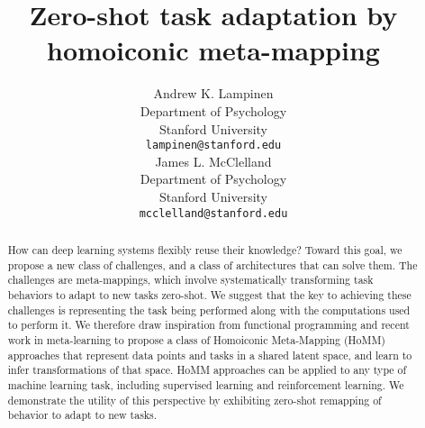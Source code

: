 \documentclass{article}
\begin{document}
\title{Zero-shot task adaptation by homoiconic meta-mapping}
\author{%
Andrew K. Lampinen\\
Department of Psychology\\
Stanford University\\
\texttt{lampinen@stanford.edu}\\
\And
James L. McClelland\\
Department of Psychology\\
Stanford University\\
\texttt{mcclelland@stanford.edu}\\
}
\date{}
\maketitle

\begin{abstract}
How can deep learning systems flexibly reuse their knowledge? Toward this goal, we propose a new class of challenges, and a class of architectures that can solve them. The challenges are meta-mappings, which involve systematically transforming task behaviors to adapt to new tasks zero-shot. We suggest that the key to achieving these challenges is representing the task being performed along with the computations used to perform it. We therefore draw inspiration from functional programming and recent work in meta-learning to propose a class of Homoiconic Meta-Mapping (HoMM) approaches that represent data points and tasks in a shared latent space, and learn to infer transformations of that space. HoMM approaches can be applied to any type of machine learning task, including supervised learning and reinforcement learning. We demonstrate the utility of this perspective by exhibiting zero-shot remapping of behavior to adapt to new tasks.
\end{abstract}

\vspace{-0.75em} %
\end{document}

